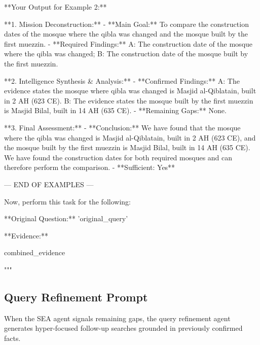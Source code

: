 \documentclass[11pt]{article}
\begin{document}
\begin{PromptBlock}
**Your Output for Example 2:**

**1. Mission Deconstruction:**
- **Main Goal:** To compare the construction dates of the mosque where the qibla was changed and the mosque built by the first muezzin.
- **Required Findings:** A: The construction date of the mosque where the qibla was changed; B: The construction date of the mosque built by the first muezzin.

**2. Intelligence Synthesis & Analysis:**
- **Confirmed Findings:** A: The evidence states the mosque where qibla was changed is Masjid al-Qiblatain, built in 2 AH (623 CE). B: The evidence states the mosque built by the first muezzin is Masjid Bilal, built in 14 AH (635 CE).
- **Remaining Gaps:** None.

**3. Final Assessment:**
- **Conclusion:** We have found that the mosque where the qibla was changed is Masjid al-Qiblatain, built in 2 AH (623 CE), and the mosque built by the first muezzin is Masjid Bilal, built in 14 AH (635 CE). We have found the construction dates for both required mosques and can therefore perform the comparison.
- **Sufficient: Yes**

--- END OF EXAMPLES ---

Now, perform this task for the following:

**Original Question:**
'{original_query}'

**Evidence:**

{combined_evidence}

"""
\end{PromptBlock}

\subsection{Query Refinement Prompt}

When the SEA agent signals remaining gaps, the query refinement agent generates hyper-focused follow-up searches grounded in previously confirmed facts.
\end{document}

